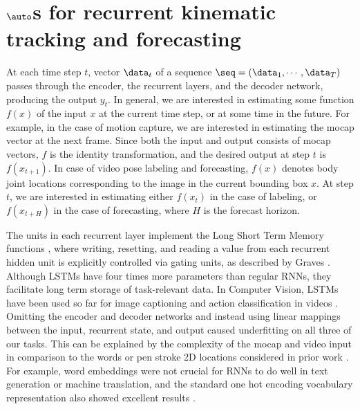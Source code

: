 \documentclass[10pt,twocolumn,letterpaper]{article}
\begin{document}
  

   




 
   \section{$\auto$s for recurrent kinematic tracking and forecasting}%
At  each time step $t$, vector $\data_t$ of a sequence  $\seq=(\data_1, \cdots, \data_T)$ passes through the encoder, the recurrent layers, and the decoder network, producing the output $y_t$. 
In general, we are interested in estimating some function $f(x)$ of the input $x$ at the current time step, or at some time in the future. For example, in the case of motion capture, we are interested in estimating the mocap vector at the next frame. Since both the input and output consists of mocap vectors, $f$ is the identity transformation, and the desired output at step $t$ is $f(x_{t+1})$.
In case of video pose labeling and forecasting, $f(x)$ denotes body joint locations corresponding to the image in the current bounding box $x$. At step $t$, we are interested in estimating either $f(x_t)$ in the case of labeling, or $f(x_{t+H})$ in the case of forecasting, where $H$ is the forecast horizon.

The units in each recurrent layer  implement the Long Short Term Memory functions \cite{Hochreiter:1997:LSM:1246443.1246450}, where writing, resetting, and reading a value from each recurrent hidden unit is explicitly controlled via gating units, as described by Graves \cite{DBLP:journals/corr/Graves13}. Although LSTMs have four times more parameters than regular RNNs, they  facilitate long term storage of task-relevant data. %
In Computer Vision, LSTMs have been used  so far for image captioning  \cite{DBLP:journals/corr/VinyalsTBE14} and action classification in videos \cite{DBLP:journals/corr/DonahueHGRVSD14}.   
Omitting the encoder and decoder networks and instead using linear mappings between the input, recurrent state, and output 
caused underfitting on all three of our tasks. 
This can be explained by the complexity of the mocap and video input in comparison to the words or pen stroke 2D  locations considered in prior work \cite{DBLP:journals/corr/Graves13}. For example, word embeddings were not crucial for RNNs to do well in text generation or machine translation, and the standard one hot encoding vocabulary representation also showed excellent results \cite{DBLP:conf/nips/SutskeverVL14}.
\end{document}
